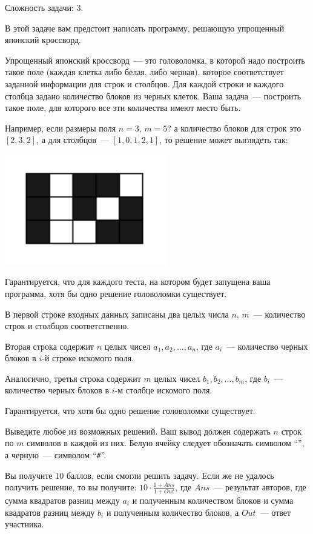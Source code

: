 
\Legend
Сложность задачи: $3$.

В этой задаче вам предстоит написать программу, решающую упрощенный японский кроссворд.

Упрощенный японский кроссворд~--- это головоломка, в которой надо построить такое поле
(каждая клетка либо белая, либо черная), которое соответствует заданной информации для строк и столбцов.
Для каждой строки и каждого столбца задано количество блоков из черных клеток.
Ваша задача~--- построить такое поле, для которого все эти количества имеют место быть.

Например, если размеры поля $n = 3$, $m = 5$? а количество блоков для строк это $[2, 3, 2]$, а для столбцов~--- $[1, 0, 1, 2, 1]$, то решение может выглядеть так:

\begin{center}
	\includegraphics[width=200pt,natwidth=680,natheight=544]{tasks/crossword/statements/images/crossword.png}
\end{center}

Гарантируется, что для каждого теста, на котором будет запущена ваша программа, хотя бы одно решение головоломки существует.

\Input
В первой строке входных данных записаны два целых числа $n$, $m$~--- количество строк и столбцов соответственно.

Вторая строка содержит $n$ целых чисел $a_1, a_2, ..., a_n$, где $a_i$~--- количество черных блоков в $i$-й строке искомого поля.

Аналогично, третья строка содержит $m$ целых чисел $b_1, b_2, ..., b_m$, где $b_i$~--- количество черных блоков в $i$-м столбце искомого поля.

Гарантируется, что хотя бы одно решение головоломки существует.

\Output
Выведите любое из возможных решений. Ваш вывод должен содержать $n$ строк по $m$ символов в каждой из них.
Белую ячейку следует обозначать символом ``\texttt{\.}'', а черную~--- символом ``\texttt{\#}''.

\Samples
\BeginTests
\EndTests

\Scoring
Вы получите $10$ баллов, если смогли решить задачу. Если же не удалось получить решение, то вы получите: $10 \cdot \frac{1 + Ans}{1 + Out}$, где $Ans$~---
результат авторов, где сумма квадратов разниц между $a_i$ и полученным количеством блоков и сумма квадратов разниц между $b_i$ и полученным количество блоков,
а $Out$~--- ответ участника.

\EndProblem
